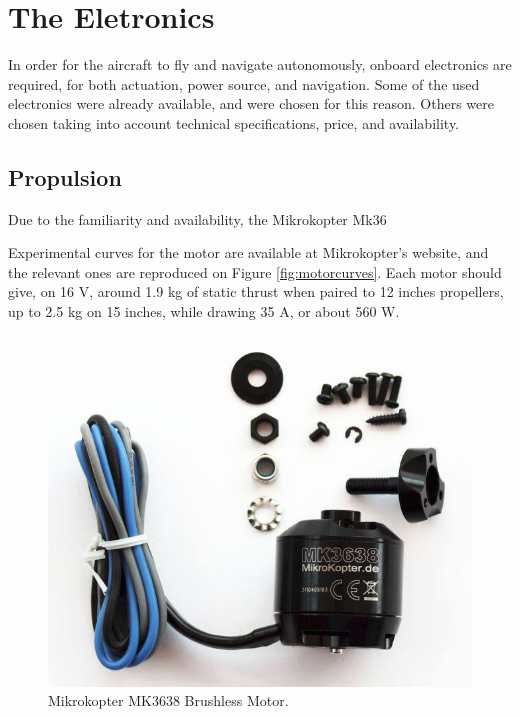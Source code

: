 
\chapter{The Eletronics} \label{chap:electronics}

In order for the aircraft to fly and navigate autonomously, onboard electronics are required, for both actuation, power source, and navigation. Some of the used electronics were already available, and were chosen for this reason. Others were chosen taking into account technical specifications, price, and availability.
	
\section{Propulsion}

Due to the familiarity and availability, the Mikrokopter Mk36%

Experimental curves for the motor are available at Mikrokopter's website, and the relevant ones are reproduced on Figure \ref{fig:motorcurves}. Each motor should give, on 16 V, around 1.9 kg of static thrust when paired to 12 inches propellers, up to 2.5 kg on 15 inches, while drawing 35 A, or about 560 W.

\begin{figure}[H]
\centering
  \includegraphics[width=0.8\linewidth]{figs/mk3638.jpg}
  \caption{Mikrokopter MK3638 Brushless Motor.}
  \label{fig:mk3638}
\end{figure}

